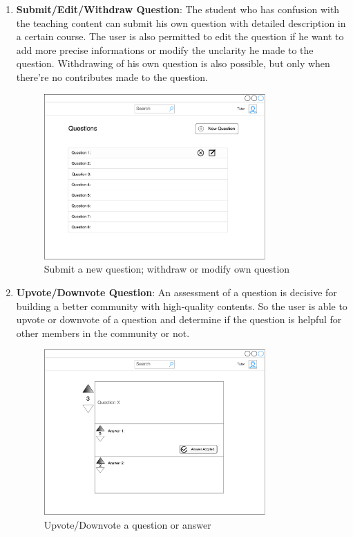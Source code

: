 \begin{enumerate}
\item
\textbf{Submit/Edit/Withdraw Question}: The student who has confusion with the teaching content can submit his own question with detailed description in a certain course. The user is also permitted to edit the question if he want to add more precise informations or modify the unclarity he made to the question. Withdrawing of his own question is also possible, but only when there're no contributes made to the question.

\begin{figure}[!htbp]
  \centering
    \includegraphics[width=0.8\textwidth]{Figures/mockup/New-question.pdf}
  \caption{Submit a new question; withdraw or modify own question}
\end{figure}

\item
\textbf{Upvote/Downvote Question}: An assessment of a question is decisive for building a better community with high-quality contents. So the user is able to upvote or downvote of a question and determine if the question is helpful for other members in the community or not.

\begin{figure}[!htbp]
  \centering
    \includegraphics[width=0.8\textwidth]{Figures/mockup/question-vote.pdf}
  \caption{Upvote/Downvote a question or answer}
\end{figure}


\end{enumerate}
